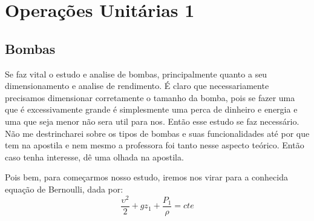 \chapter{Operações Unitárias 1}
\section{Bombas}

Se faz vital o estudo e analise de bombas, principalmente quanto a seu dimensionamento e analise de
rendimento. É claro que necessariamente precisamos dimensionar corretamente o tamanho da bomba, pois
se fazer uma que é excessivamente grande é simplesmente uma perca de dinheiro e energia e uma que
seja menor não sera util para nos. Então esse estudo se faz necessário. Não me destrincharei sobre
os tipos de bombas e suas funcionalidades até por que tem na apostila e nem mesmo a professora foi
tanto nesse aspecto teórico. Então caso tenha interesse, dê uma olhada na apostila. \par

Pois bem, para começarmos nosso estudo, iremos nos virar para a conhecida equação de Bernoulli, dada
por: 
\begin{equation}\label{eq:Eq de Bernoulli}
    \frac{\upsilon ^{2}}{2}+gz_1+\frac{P_1}{\rho }=cte
\end{equation}

